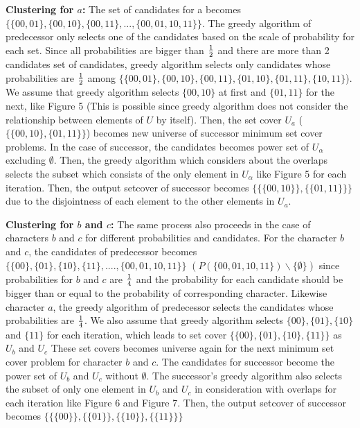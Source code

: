 \textbf{Clustering for $a$: }
The set of candidates for a becomes 
$\{\{00, 01\}, \{00, 10\}, \{00, 11\}, ..., \{00, 01, 10, 11\}\}$.
The greedy algorithm of predecessor only selects one of the candidates based on the scale of probability 
for each set. 
Since all probabilities are bigger than ${1 \over 2}$ and there are more than 2 candidates set of candidates,
greedy algorithm selects only candidates whose probabilities are ${1 \over 2}$ 
among $\{\{00, 01\}, \{00, 10\}, \{00, 11\}, \{01, 10\}, \{01, 11\}, \{10, 11\}$).
We assume that greedy algorithm selects $\{00, 10\}$ at first and $\{01, 11\}$ for the next, like Figure 5 
(This is possible since greedy algorithm does not consider the relationship between elements of $U$ by itself).
Then, the set cover $U_a$ ($\{\{00, 10\},\{01, 11\}\}$) becomes new universe of successor minimum set cover problems. 
In the case of successor, the candidates becomes power set of $U_{\alpha}$ excluding $\emptyset$.
Then, the greedy algorithm which considers about the overlaps selects the subset 
which consists of the only element in $U_{\alpha}$ like Figure 5 for each iteration. 
Then, the output setcover of successor becomes $\{\{\{00,10\}\},\{\{01,11\}\}\}$ 
due to the disjointness of each element to the other elements in $U_a$.


\textbf{Clustering for $b$ and $c$: }
The same process also proceeds in the case of characters $b$ and $c$ for different probabilities and candidates. 
For the character $b$ and $c$, the candidates of predecessor becomes $\{\{00\}, \{01\}, \{10\}, \{11\},....,\{00,01,10,11\}\}$
$(P(\{00,01,10,11\})\backslash \{ \emptyset \})$ since probabilities for $b$ and $c$ are ${1 \over 4}$ and 
the probability for each candidate should be bigger than or equal to the probability of corresponding character.
Likewise character $a$, the greedy algorithm of predecessor selects the candidates whose probabilities are ${1 \over 4}$.
We also assume that greedy algorithm selects $\{00\}, \{01\}, \{10\}$ and $\{11\}$ for each iteration,
which leads to set cover $\{\{00\}, \{01\}, \{10\}, \{11\}\}$ as $U_{b}$ and $U_{c}$
These set covers becomes universe again for the next minimum set cover problem for character $b$ and $c$.
The candidates for successor become the power set of $U_b$ and $U_c$ without $\emptyset$. 
The successor's greedy algorithm also selects the subset of only one element in $U_b$ and $U_c$
in consideration with overlaps for each iteration like Figure 6 and Figure 7.
Then, the output setcover of successor becomes $\{\{\{00\}\},\{\{01\}\},\{\{10\}\},\{\{11\}\}\}$

